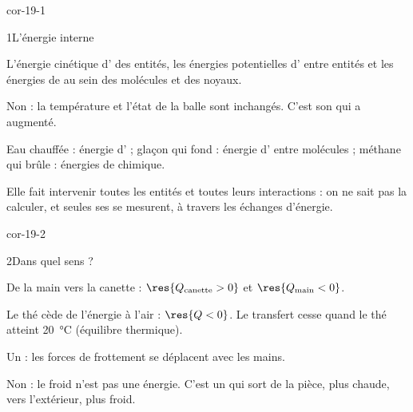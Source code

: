 \corrigesSouples

\begin{blocLivre}{cor-19-1}
\begin{corrige}{1}{L'énergie interne}
\begin{questions}
\item L'énergie cinétique d' des entités, les énergies potentielles d' entre
entités et les énergies de  au sein des molécules et des noyaux.
\item Non : la température et l'état de la balle sont inchangés. C'est son 
qui a augmenté.
\item Eau chauffée : énergie d' ; glaçon qui fond : énergie d' entre molécules ;
méthane qui brûle : énergies de  chimique.
\item Elle fait intervenir toutes les entités et toutes leurs interactions : on ne sait pas la calculer, et seules ses
 se mesurent, à travers les échanges d'énergie.
\end{questions}
\end{corrige}
\end{blocLivre}
\begin{blocLivre}{cor-19-2}
\begin{corrige}{2}{Dans quel sens ?}
\begin{questions}
\item De la main vers la canette : $\res{Q_\text{canette}>0}$ et $\res{Q_\text{main}<0}$.
\item Le thé cède de l'énergie à l'air : $\res{Q<0}$. Le transfert cesse quand le thé atteint \qty{20}{\degreeCelsius}
(équilibre thermique).
\item Un  : les forces de frottement se déplacent avec les mains.
\item Non : le froid n'est pas une énergie. C'est un  qui sort de la pièce, plus chaude,
vers l'extérieur, plus froid.
\end{questions}
\end{corrige}
\end{blocLivre}
